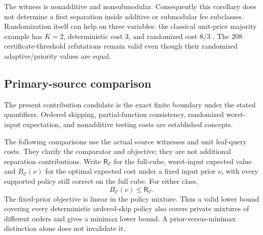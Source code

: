 \documentclass[pdflatex,sn-mathphys-num]{sn-jnl}
\newcommand{\RR}{\mathsf{R}}
\theoremstyle{thmstyleone}
\theoremstyle{thmstylethree}
\theoremstyle{thmstyletwo}
\begin{document}
The witness is nonadditive and nonsubmodular. Consequently this corollary
does not determine a first separation inside additive or submodular fee
subclasses. Randomization itself can help on three variables:
the classical unit-price majority example has $K=2$, deterministic
cost $3$, and randomized cost $8/3$ \cite{amano2011directional}.
The $208$ certificate-threshold refutations remain valid even though
their randomized adaptive/priority values are equal.

\subsection{Primary-source comparison}
\label{sec:generic-related-scope}
The present contribution candidate is the exact finite boundary under
the stated quantifiers. Ordered skipping, partial-function consistency,
randomized worst-input expectation, and nonadditive testing costs
are established concepts.

The following comparisons use the actual source witnesses and unit
leaf-query costs. They clarify the comparator and objective; they are
not additional separation contributions. Write $\RR_{\mathcal C}$ for
the full-cube, worst-input expected value and $B_{\mathcal C}(\nu)$ for
the optimal expected cost under a fixed input prior $\nu$, with every
supported policy still correct on the full cube. For either class,
\[
 B_{\mathcal C}(\nu)\leq\RR_{\mathcal C}.
\]
The fixed-prior objective is linear in the policy mixture. Thus a valid
lower bound covering every deterministic ordered-skip policy also covers
private mixtures of different orders and gives a minimax lower bound.
A prior-versus-minimax distinction alone does not invalidate it.
\end{document}

